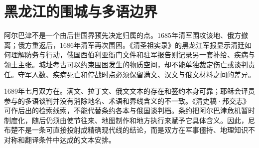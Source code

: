 \section{黑龙江的围城与多语边界}

阿尔巴津不是一个由后世国界预先决定归属的点。1685年清军围攻该地、俄方撤离；俄方重返后，1686年清军再次围困。《清圣祖实录》的黑龙江军报显示清廷如何理解防务与行动，俄国西伯利亚衙门文件和驻军报告则记录另一套补给、疾病与领土主张。城址考古可以约束围困发生的物质空间，却不能单独裁定伤亡或谈判责任。守军人数、疾病死亡和停战时点必须保留满文、汉文与俄文材料之间的差异。

1689年七月双方在。满文、拉丁文、俄文文本的存在和签约本身可靠；耶稣会译员参与的多语谈判并没有消除地名、术语和界线含义的不一致。《清史稿·邦交志》可作后出的检索线索，不能代替条约各本与俄国谈判档。条约把阿尔巴津危机暂时制度化，随后仍须由使节往来、地图制作和地方执行来赋予它具体含义。因此，尼布楚不是一条可直接投射成精确现代线的结论，而是双方在军事僵持、地理知识不对称和翻译条件中达成的文本安排。
